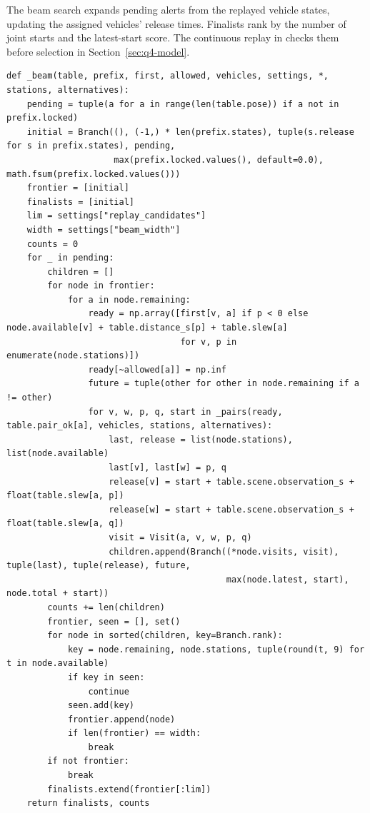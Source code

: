 \documentclass{swmcmthesis}
\begin{document}
The beam search expands pending alerts from the replayed vehicle states, updating the assigned vehicles' release times. Finalists rank by the number of joint starts and the latest-start score. The continuous replay in  checks them before selection in Section~\ref{sec:q4-model}.

\noindent{}
\begin{lstlisting}
def _beam(table, prefix, first, allowed, vehicles, settings, *, stations, alternatives):
    pending = tuple(a for a in range(len(table.pose)) if a not in prefix.locked)
    initial = Branch((), (-1,) * len(prefix.states), tuple(s.release for s in prefix.states), pending,
                     max(prefix.locked.values(), default=0.0), math.fsum(prefix.locked.values()))
    frontier = [initial]
    finalists = [initial]
    lim = settings["replay_candidates"]
    width = settings["beam_width"]
    counts = 0
    for _ in pending:
        children = []
        for node in frontier:
            for a in node.remaining:
                ready = np.array([first[v, a] if p < 0 else node.available[v] + table.distance_s[p] + table.slew[a]
                                  for v, p in enumerate(node.stations)])
                ready[~allowed[a]] = np.inf
                future = tuple(other for other in node.remaining if a != other)
                for v, w, p, q, start in _pairs(ready, table.pair_ok[a], vehicles, stations, alternatives):
                    last, release = list(node.stations), list(node.available)
                    last[v], last[w] = p, q
                    release[v] = start + table.scene.observation_s + float(table.slew[a, p])
                    release[w] = start + table.scene.observation_s + float(table.slew[a, q])
                    visit = Visit(a, v, w, p, q)
                    children.append(Branch((*node.visits, visit), tuple(last), tuple(release), future,
                                           max(node.latest, start), node.total + start))
        counts += len(children)
        frontier, seen = [], set()
        for node in sorted(children, key=Branch.rank):
            key = node.remaining, node.stations, tuple(round(t, 9) for t in node.available)
            if key in seen:
                continue
            seen.add(key)
            frontier.append(node)
            if len(frontier) == width:
                break
        if not frontier:
            break
        finalists.extend(frontier[:lim])
    return finalists, counts
\end{lstlisting}
\end{document}
